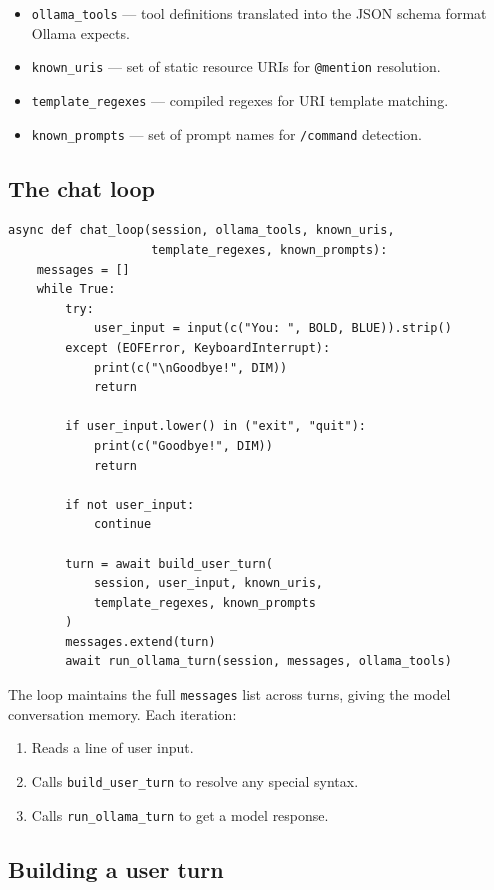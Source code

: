 \documentclass[11pt, a4paper]{article}
\begin{document}
\begin{itemize}
  \item \texttt{ollama\_tools} — tool definitions translated into the JSON schema format Ollama expects.
  \item \texttt{known\_uris} — set of static resource URIs for \texttt{@mention} resolution.
  \item \texttt{template\_regexes} — compiled regexes for URI template matching.
  \item \texttt{known\_prompts} — set of prompt names for \texttt{/command} detection.
\end{itemize}

\subsection{The chat loop}

\begin{lstlisting}[caption={chat\_loop}]
async def chat_loop(session, ollama_tools, known_uris,
                    template_regexes, known_prompts):
    messages = []
    while True:
        try:
            user_input = input(c("You: ", BOLD, BLUE)).strip()
        except (EOFError, KeyboardInterrupt):
            print(c("\nGoodbye!", DIM))
            return

        if user_input.lower() in ("exit", "quit"):
            print(c("Goodbye!", DIM))
            return

        if not user_input:
            continue

        turn = await build_user_turn(
            session, user_input, known_uris,
            template_regexes, known_prompts
        )
        messages.extend(turn)
        await run_ollama_turn(session, messages, ollama_tools)
\end{lstlisting}

The loop maintains the full \texttt{messages} list across turns, giving the model conversation memory. Each iteration:
\begin{enumerate}
  \item Reads a line of user input.
  \item Calls \texttt{build\_user\_turn} to resolve any special syntax.
  \item Calls \texttt{run\_ollama\_turn} to get a model response.
\end{enumerate}

\subsection{Building a user turn}
\end{document}
